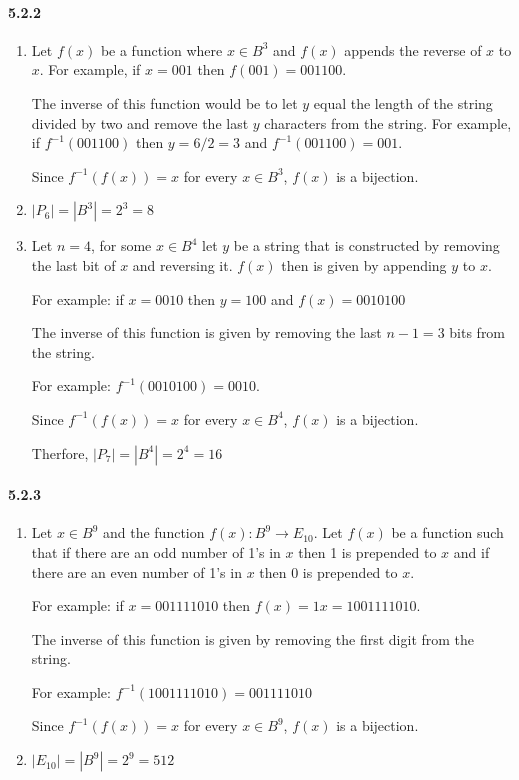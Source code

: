 \documentclass[11pt, letterpaper, twocolumn, fleqn]{article}
\begin{document}
\paragraph{5.2.2}
\begin{enumerate}
  \item Let $f(x)$ be a function where $x \in B^3$ and $f(x)$ appends the reverse of $x$ to $x$. For example, if $x = 001$ then $f(001) = 001100$. 
  
  The inverse of this function would be to let $y$ equal the length of the string divided by two and remove the last $y$ characters from the string. For example, if $f^{-1}(001100)$ then $y=6/2=3$ and $f^{-1}(001100)=001$. 
  
  Since $f^{-1}(f(x)) = x$ for every $x \in B^3$, $f(x)$ is a bijection.
  \item $|P_6| = |B^3| = 2^3 = 8$
  \item Let $n=4$, for some $x \in B^4$ let $y$ be a string that is constructed by removing the last bit of $x$ and reversing it. $f(x)$ then is given by appending $y$ to $x$. 
  
  For example: if $x = 0010$ then $y =100$ and $f(x) = 0010100$ 
  
  The inverse of this function is given by removing the last $n-1 = 3$ bits from the string. 
  
  For example: $f^{-1}(0010100) = 0010$.
  
  Since $f^{-1}(f(x)) = x$ for every $x \in B^4$, $f(x)$ is a bijection.
  
  Therfore, $|P_7| = |B^4| = 2^4 = 16$
\end{enumerate}

\paragraph{5.2.3}
\begin{enumerate}
  \item Let $x \in B^9$ and the function $f(x):B^9 \rightarrow E_{10}$. Let $f(x)$ be a function such that if there are an odd number of 1's in $x$ then 1 is prepended to $x$ and if there are an even number of 1's in $x$ then 0 is prepended to $x$.
  
  For example: if $x = 0 0111 1010$ then $f(x) =1x= 10 0111 1010$.
  
  The inverse of this function is given by removing the first digit from the string.
  
  For example: $f^{-1}(10 0111 1010) = 0 0111 1010$
  
  Since $f^{-1}(f(x)) = x$ for every $x \in B^9$, $f(x)$ is a bijection.
  \item $|E_{10}| = |B^9| = 2^9 = 512$
\end{enumerate}
\end{document}
